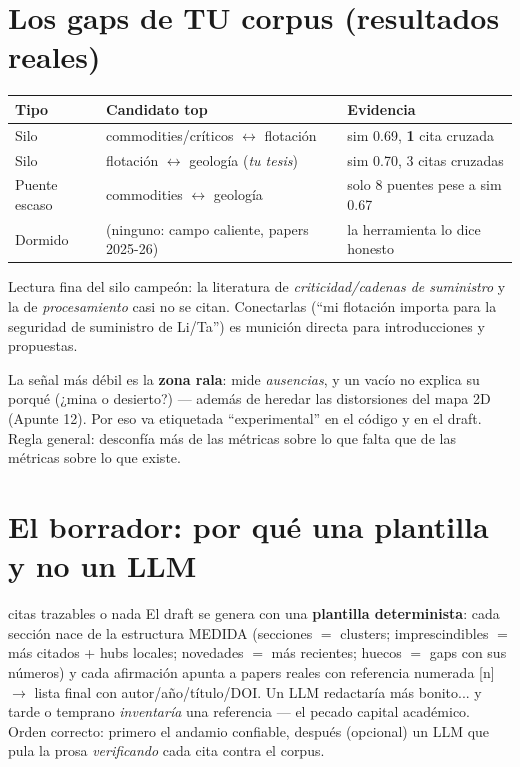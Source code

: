 \documentclass[11pt,a4paper]{article}
\begin{document}
\section{Los gaps de TU corpus (resultados reales)}

\begin{center}
\begin{tabular}{lp{6.2cm}l}
\textbf{Tipo} & \textbf{Candidato top} & \textbf{Evidencia} \\
\hline
Silo & commodities/críticos $\leftrightarrow$ flotación & sim 0.69, \textbf{1} cita cruzada \\
Silo & flotación $\leftrightarrow$ geología (\emph{tu tesis}) & sim 0.70, 3 citas cruzadas \\
Puente escaso & commodities $\leftrightarrow$ geología & solo 8 puentes pese a sim 0.67 \\
Dormido & (ninguno: campo caliente, papers 2025-26) & la herramienta lo dice honesto \\
\end{tabular}
\end{center}

Lectura fina del silo campeón: la literatura de \emph{criticidad/cadenas de suministro} y la
de \emph{procesamiento} casi no se citan. Conectarlas (``mi flotación importa para la
seguridad de suministro de Li/Ta'') es munición directa para introducciones y propuestas.

\begin{ojo}
La señal más débil es la \textbf{zona rala}: mide \emph{ausencias}, y un vacío no explica su
porqué (¿mina o desierto?) — además de heredar las distorsiones del mapa 2D (Apunte 12). Por
eso va etiquetada ``experimental'' en el código y en el draft. Regla general: desconfía más
de las métricas sobre lo que falta que de las métricas sobre lo que existe.
\end{ojo}

\section{El borrador: por qué una plantilla y no un LLM}

\begin{concepto}{citas trazables o nada}
El draft se genera con una \textbf{plantilla determinista}: cada sección nace de la
estructura MEDIDA (secciones $=$ clusters; imprescindibles $=$ más citados + hubs locales;
novedades $=$ más recientes; huecos $=$ gaps con sus números) y cada afirmación apunta a
papers reales con referencia numerada [n] $\rightarrow$ lista final con autor/año/título/DOI.
Un LLM redactaría más bonito... y tarde o temprano \emph{inventaría} una referencia — el
pecado capital académico. Orden correcto: primero el andamio confiable, después (opcional)
un LLM que pula la prosa \emph{verificando} cada cita contra el corpus.
\end{concepto}
\end{document}
